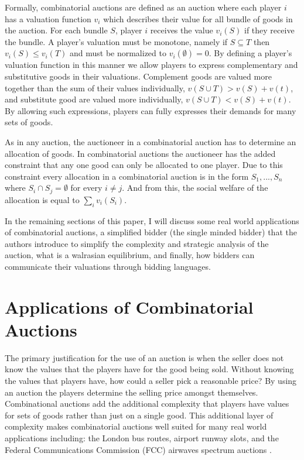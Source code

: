 \documentclass[10pt,onecolumn,letterpaper]{article}
\theoremstyle{definition}
\begin{document}
Formally, combinatorial auctions are defined as an auction where each player $i$ has a valuation function $v_i$ which describes their value for all bundle of goods in the auction. For each bundle $S$, player $i$ receives the value $v_i(S)$ if they receive the bundle. A player's valuation must be monotone, namely if $S \subseteq T$ then $v_i(S) \leq v_i(T)$ and must be normalized to $v_i(\emptyset)= 0$. By defining a player's valuation function in this manner we allow players to express complementary and substitutive goods in their valuations. Complement goods are valued more together than the sum of their values individually, $v(S \cup T) > v(S) + v(t)$, and substitute good are valued more individually, $v(S \cup T) < v(S) + v(t)$. By allowing such expressions, players can fully expresses their demands for many sets of goods.

As in any auction, the auctioneer in a combinatorial auction has to determine an allocation of goods. In combinatorial auctions the auctioneer has the added constraint that any one good can only be allocated to one player. Due to this constraint every allocation in a combinatorial auction is in the form $S_1,...,S_n$ where $S_i \cap S_j = \emptyset$ for every $i \neq j$. And from this, the social welfare of the allocation is equal to $\sum_i v_i(S_i)$.

In the remaining sections of this paper, I will discuss some real world applications of combinatorial auctions, a simplified bidder (the single minded bidder) that the authors introduce to simplify the complexity and strategic analysis of the auction, what is a walrasian equilibrium, and finally, how bidders can communicate their valuations through bidding languages.

\section{Applications of Combinatorial Auctions}

The primary justification for the use of an auction is when the seller does not know the values that the players have for the good being sold. Without knowing the values that players have, how could a seller pick a reasonable price? By using an auction the players determine the selling price amongst themselves. Combinational auctions add the additional complexity that players have values for sets of goods rather than just on a single good. This additional layer of complexity makes combinatorial auctions well suited for many real world applications including: the London bus routes, airport runway slots, and the Federal Communications Commission (FCC) airwaves spectrum auctions \cite{real world}. 
\end{document}

